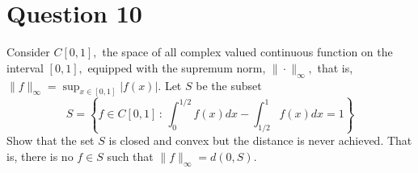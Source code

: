 \section{Question 10}

\horz
Consider $C[0,1],$ the space of all complex valued continuous function on the interval $[0,1],$ equipped with the supremum norm, $\|\cdot\|_{\infty},$ that is, $\|f\|_{\infty}=\sup_{x\in [0,1]} |f(x)|.$ Let $S$ be the subset
    \begin{equation*}
	S=\left\{ f \in C[0,1] \, : \, \int_{0}^{1/2} f\left( x \right) dx - \int_{1/2}^{1} f \left( x \right) dx =1 \right\}
    \end{equation*}
    Show that the set $S$ is closed and convex but the distance is never achieved. That is, there is no $f\in S$ such that $\|f\|_{\infty} = d(0,S)$.
    

